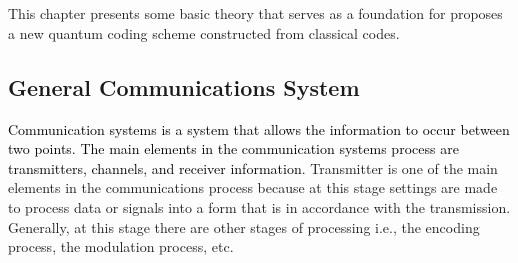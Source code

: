 \chapter{\babDua}
This chapter presents some basic theory that serves as a foundation for proposes a new quantum coding scheme constructed from classical codes. 
\section{General Communications System}

\textcolor{black}{Communication systems is a system that allows the information to occur between two points. The main elements in the communication systems process are transmitters, channels, and receiver information}. Transmitter is one of the main elements in the communications process because at this stage settings are made to process data or signals into a form that is in accordance with the transmission. Generally, at this stage there are other stages of processing i.e., the encoding process, the modulation process, etc. 
